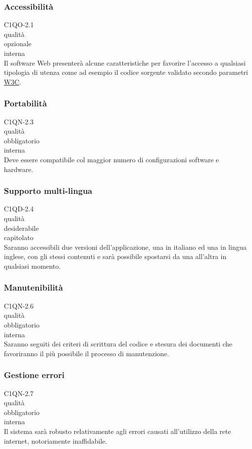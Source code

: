 \subsubsection*{Accessibilit\`a}
 C1QO-2.1 \\
 qualit\`a \\
 opzionale \\
 interna \\
Il software Web presenter\`a alcune caratteristiche per favorire l'accesso a
qualsiasi tipologia di utenza come ad esempio il codice sorgente validato
secondo parametri \underline{W3C}.

\subsubsection*{Portabilit\`a}
 C1QN-2.3 \\
 qualit\`a \\
 obbligatorio \\
 interna \\
Deve essere compatibile col maggior numero di configurazioni software e
hardware.

\subsubsection*{Supporto multi-lingua}
 C1QD-2.4 \\
 qualit\`a \\
 desiderabile \\
 capitolato \\
Saranno accessibili due versioni dell'applicazione, una in italiano ed una in
lingua inglese, con gli stessi contenuti e sar\`a possibile spostarsi da una
all'altra in qualsiasi momento.

\subsubsection*{Manutenibilit\`a}
 C1QN-2.6 \\
 qualit\`a \\
 obbligatorio \\
 interna \\
Saranno seguiti dei criteri di scrittura del codice e stesura dei documenti che
favoriranno il pi\`u possibile il processo di manutenzione.

\subsubsection*{Gestione errori}
 C1QN-2.7 \\
 qualit\`a \\
 obbligatorio \\
 interna \\
Il sistema sar\`a robusto relativamente agli errori causati all'utilizzo della
rete internet, notoriamente inaffidabile.

